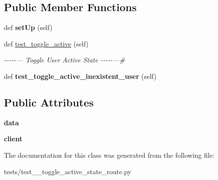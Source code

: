 \subsection*{Public Member Functions}
\begin{DoxyCompactItemize}
\item 
\mbox{\label{classtests_1_1test__9__toggle__active__state__route_1_1_test_user_routes_aa05d4f8a3551c00ad2a2826f15b7d435}} 
def {\bfseries set\+Up} (self)
\item 
\mbox{\label{classtests_1_1test__9__toggle__active__state__route_1_1_test_user_routes_a1c7f7946f2ce4257ed874721b713bd59}} 
def \hyperlink{classtests_1_1test__9__toggle__active__state__route_1_1_test_user_routes_a1c7f7946f2ce4257ed874721b713bd59}{test\+\_\+toggle\+\_\+active} (self)
\begin{DoxyCompactList}\small\item\em -\/-\/-\/-\/-\/--- Toggle User Active State -\/-\/-\/-\/-\/---\# \end{DoxyCompactList}\item 
\mbox{\label{classtests_1_1test__9__toggle__active__state__route_1_1_test_user_routes_a7d7feca8a22ff49a581c9d3b0adb2f1f}} 
def {\bfseries test\+\_\+toggle\+\_\+active\+\_\+inexistent\+\_\+user} (self)
\end{DoxyCompactItemize}
\subsection*{Public Attributes}
\begin{DoxyCompactItemize}
\item 
\mbox{\label{classtests_1_1test__9__toggle__active__state__route_1_1_test_user_routes_a68dcf87c59d452edfceae5a345f86cd3}} 
{\bfseries data}
\item 
\mbox{\label{classtests_1_1test__9__toggle__active__state__route_1_1_test_user_routes_a1ab4889e7b6b5e8700dbf976b4b6b200}} 
{\bfseries client}
\end{DoxyCompactItemize}


The documentation for this class was generated from the following file\+:\begin{DoxyCompactItemize}
\item 
tests/test\+\_\+\_\+toggle\+\_\+active\+\_\+state\+\_\+route.\+py\end{DoxyCompactItemize}
